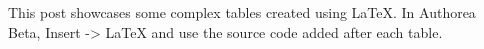 This post showcases some complex tables created using LaTeX. In Authorea Beta, Insert -> LaTeX and use the source code added after each table.

\newline